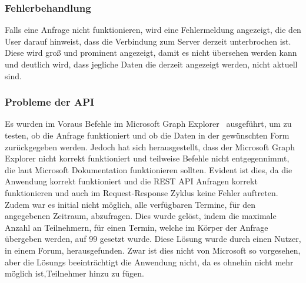 \subsubsection{Fehlerbehandlung}\label{subsubsec:fehlerbehandlung-REST}
Falls eine Anfrage nicht funktionieren, wird eine Fehlermeldung angezeigt, die den User darauf hinweist, dass die Verbindung zum Server derzeit unterbrochen ist.
Diese wird groß und prominent angezeigt, damit es nicht übersehen werden kann und deutlich wird, dass jegliche Daten die derzeit angezeigt werden, nicht aktuell sind.
\newline
\newline
\subsubsection{Probleme der API}\label{subsubsec:probleme-der-api}
Es wurden im Voraus Befehle im Microsoft Graph Explorer~\cite{Microsoft-Graph-Explorer} ausgeführt, um zu testen, ob die Anfrage funktioniert und ob die Daten in der gewünschten Form zurückgegeben werden.
Jedoch hat sich herausgestellt, dass der Microsoft Graph Explorer nicht korrekt funktioniert und teilweise Befehle nicht entgegennimmt, die laut Microsoft Dokumentation funktionieren sollten.
Evident ist dies, da die Anwendung korrekt funktioniert und die REST API Anfragen korrekt funktionieren und auch im Request-Response Zyklus keine Fehler auftreten.
\newline
\newline
Zudem war es initial nicht möglich, alle verfügbaren Termine, für den angegebenen Zeitraum, abzufragen.
Dies wurde gelöst, indem die maximale Anzahl an Teilnehmern, für einen Termin, welche im Körper der Anfrage übergeben werden, auf 99 gesetzt wurde.
Diese Lösung wurde durch einen Nutzer, in einem Forum, herausgefunden.
Zwar ist dies nicht von Microsoft so vorgesehen, aber die Lösungs beeinträchtigt die Anwendung nicht, da es ohnehin nicht mehr möglich ist,Teilnehmer hinzu zu fügen.
\newline
\newline
